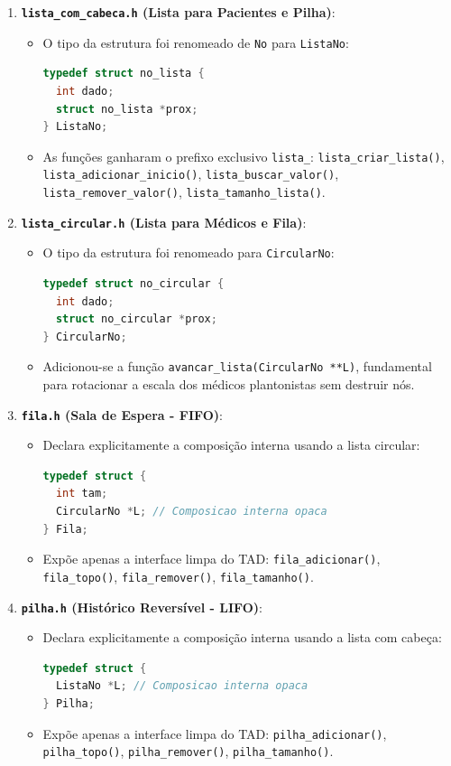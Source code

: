 \documentclass[11pt,a4paper]{article}
\begin{document}
\begin{enumerate}
    \item \textbf{\texttt{lista\_com\_cabeca.h} (Lista para Pacientes e Pilha)}:
    \begin{itemize}
        \item O tipo da estrutura foi renomeado de \texttt{No} para \texttt{ListaNo}:
\begin{lstlisting}[language=C]
typedef struct no_lista {
  int dado;
  struct no_lista *prox;
} ListaNo;
\end{lstlisting}
        \item As funções ganharam o prefixo exclusivo \texttt{lista\_}: \texttt{lista\_criar\_lista()}, \texttt{lista\_adicionar\_inicio()}, \texttt{lista\_buscar\_valor()}, \texttt{lista\_remover\_valor()}, \texttt{lista\_tamanho\_lista()}.
    \end{itemize}

    \item \textbf{\texttt{lista\_circular.h} (Lista para Médicos e Fila)}:
    \begin{itemize}
        \item O tipo da estrutura foi renomeado para \texttt{CircularNo}:
\begin{lstlisting}[language=C]
typedef struct no_circular {
  int dado;
  struct no_circular *prox;
} CircularNo;
\end{lstlisting}
        \item Adicionou-se a função \texttt{avancar\_lista(CircularNo **L)}, fundamental para rotacionar a escala dos médicos plantonistas sem destruir nós.
    \end{itemize}

    \item \textbf{\texttt{fila.h} (Sala de Espera - FIFO)}:
    \begin{itemize}
        \item Declara explicitamente a composição interna usando a lista circular:
\begin{lstlisting}[language=C]
typedef struct {
  int tam; 
  CircularNo *L; // Composicao interna opaca
} Fila;
\end{lstlisting}
        \item Expõe apenas a interface limpa do TAD: \texttt{fila\_adicionar()}, \texttt{fila\_topo()}, \texttt{fila\_remover()}, \texttt{fila\_tamanho()}.
    \end{itemize}

    \item \textbf{\texttt{pilha.h} (Histórico Reversível - LIFO)}:
    \begin{itemize}
        \item Declara explicitamente a composição interna usando a lista com cabeça:
\begin{lstlisting}[language=C]
typedef struct {
  ListaNo *L; // Composicao interna opaca
} Pilha;
\end{lstlisting}
        \item Expõe apenas a interface limpa do TAD: \texttt{pilha\_adicionar()}, \texttt{pilha\_topo()}, \texttt{pilha\_remover()}, \texttt{pilha\_tamanho()}.
    \end{itemize}
\end{enumerate}
\end{document}
